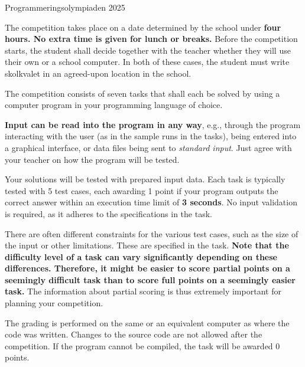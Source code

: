 

\thispagestyle{fancy}
\lstset{basicstyle=\ttfamily,
  breaklines=true}

\begin{center}
\Huge{Programmeringsolympiaden 2025}
\end{center}
\vspace{-1.2cm} 
\begin{lista}
\item The competition takes place on a date determined by the school under {\bf four hours.
    No extra time is given for lunch or breaks.} Before the competition starts, the student
    shall decide together with the teacher whether they will use their own or a school computer.
    In both of these cases, the student must write skolkvalet in an agreed-upon location
    in the school.
    
\item The competition consists of seven tasks that shall each be solved by using a computer
  program in your programming language of choice.
\item {\bf Input can be read into the program in any way}, e.g., through the program interacting
with the user (as in the sample runs in the tasks), being entered into a graphical interface,
or data files being sent to {\em standard input}. Just agree with your teacher on how the program will be tested.
\item Your solutions will be tested with prepared input data. Each task is typically tested
with 5 test cases, each awarding 1 point if your program outputs the correct answer within
an execution time limit of {\bf 3 seconds}. No input validation is required, as it adheres
to the specifications in the task.
\item There are often different constraints for the various test cases, such as the size of
the input or other limitations. These are specified in the task. {\bf Note that the difficulty
level of a task can vary significantly depending on these differences. Therefore, it might
be easier to score partial points on a seemingly difficult task than to score full points
on a seemingly easier task.} The information about partial scoring is thus extremely
important for planning your competition.
\item The grading is performed on the same or an equivalent computer as where the code was written.
Changes to the source code are not allowed after the competition. If the program cannot be
compiled, the task will be awarded 0 points.


\end{lista}
